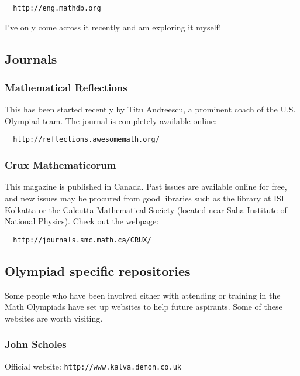\documentclass[a4paper]{amsart}
\begin{document}
\begin{verbatim}
  http://eng.mathdb.org
\end{verbatim}

I've only come across it recently and am exploring it myself!

\subsection{Journals}

\subsubsection{Mathematical Reflections}

This has been started recently by Titu Andreescu, a prominent coach of the U.S. Olympiad team.
The journal is completely available online:

\begin{verbatim}
  http://reflections.awesomemath.org/
\end{verbatim}

\subsubsection{Crux Mathematicorum}

This magazine is published in Canada. Past issues are available online for free,
and new issues may be procured from good libraries such as the library at ISI Kolkatta
or the Calcutta Mathematical Society (located near Saha Institute of National Physics).
Check out the webpage:

\begin{verbatim}
  http://journals.smc.math.ca/CRUX/
\end{verbatim}

\subsection{Olympiad specific repositories}

Some people who have been involved either with attending or training in the Math Olympiads have set up websites
to help future aspirants. Some of these websites  are worth visiting.

\subsubsection{John Scholes}

Official website: {\tt http://www.kalva.demon.co.uk}
\end{document}
